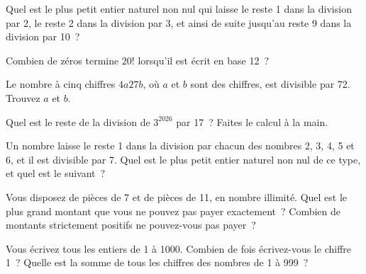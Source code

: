 \begin{question}\label{iq:iv1:number-riddles:6}
Quel est le plus petit entier naturel non nul qui laisse le reste 1 dans la division par 2, le reste 2 dans la division par 3, et ainsi de suite jusqu'au reste 9 dans la division par 10~?
\end{question}

\begin{question}\label{iq:iv1:number-riddles:7}
Combien de zéros termine $20!$ lorsqu'il est écrit en base 12~?
\end{question}

\begin{question}\label{iq:iv1:number-riddles:8}
Le nombre à cinq chiffres $4a27b$, où $a$ et $b$ sont des chiffres, est divisible par 72. Trouvez $a$ et $b$.
\end{question}

\begin{question}\label{iq:iv1:number-riddles:9}
Quel est le reste de la division de $3^{2026}$ par 17~? Faites le calcul à la main.
\end{question}

\begin{question}\label{iq:iv1:number-riddles:10}
Un nombre laisse le reste 1 dans la division par chacun des nombres 2, 3, 4, 5 et 6, et il est divisible par 7. Quel est le plus petit entier naturel non nul de ce type, et quel est le suivant~?
\end{question}

\begin{question}\label{iq:iv1:number-riddles:11}
Vous disposez de pièces de 7 et de pièces de 11, en nombre illimité. Quel est le plus grand montant que vous ne pouvez pas payer exactement~? Combien de montants strictement positifs ne pouvez-vous pas payer~?
\end{question}

\begin{question}\label{iq:iv1:number-riddles:12}
Vous écrivez tous les entiers de 1 à 1000. Combien de fois écrivez-vous le chiffre 1~? Quelle est la somme de tous les chiffres des nombres de 1 à 999~?
\end{question}

